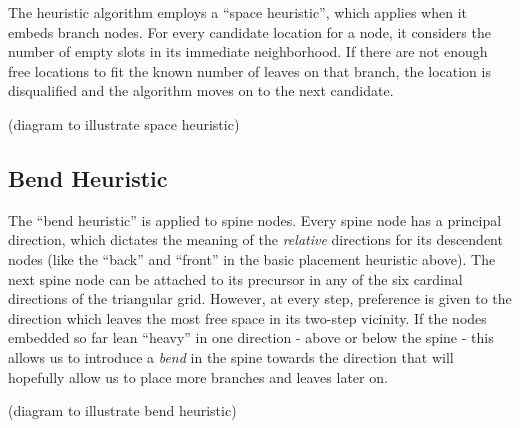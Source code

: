 \documentclass{article}
\begin{document}
The heuristic algorithm employs a ``space heuristic'', which applies when it embeds branch nodes.
For every candidate location for a node, it considers the number of empty slots in its immediate neighborhood. If there are not enough free locations to fit the known number of leaves on that branch, the location is disqualified and the algorithm moves on to the next candidate.

(diagram to illustrate space heuristic)

\subsection{Bend Heuristic}

The ``bend heuristic'' is applied to spine nodes.
Every spine node has a principal direction, which dictates the meaning of the \emph{relative} directions for its descendent nodes (like the ``back'' and ``front'' in the basic placement heuristic above).
The next spine node can be attached to its precursor in any of the six cardinal directions of the triangular grid. However, at every step, preference is given to the direction which leaves the most free space in its two-step vicinity.
If the nodes embedded so far lean ``heavy'' in one direction - above or below the spine - this allows us to introduce a \emph{bend} in the spine towards the direction that will hopefully allow us to place more branches and leaves later on.

(diagram to illustrate bend heuristic)
\end{document}
